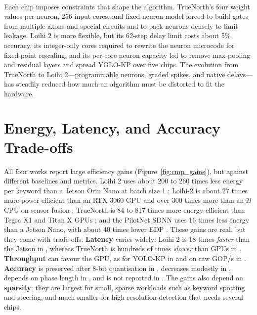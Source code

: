 \documentclass[12pt,a4paper,final]{extreport}
\begin{document}
\paragraph{} Each chip imposes constraints that shape the algorithm. TrueNorth's four weight values per neuron, 256-input cores, and fixed neuron model forced \cite{p3} to build gates from multiple axons and special circuits and to pack neurons densely to limit leakage. Loihi 2 is more flexible, but its 62-step delay limit costs \cite{p1} about 5\% accuracy, its integer-only cores required \cite{p4} to rewrite the neuron microcode for fixed-point rescaling, and its per-core neuron capacity led \cite{p4} to remove max-pooling and residual layers and spread YOLO-KP over five chips. The evolution from TrueNorth to Loihi 2---programmable neurons, graded spikes, and native delays---has steadily reduced how much an algorithm must be distorted to fit the hardware.

\section{Energy, Latency, and Accuracy Trade-offs}

\paragraph{} All four works report large efficiency gains (Figure~\ref{fig:cmp_gains}), but against different baselines and metrics. Loihi 2 uses about 200 to 260 times less energy per keyword than a Jetson Orin Nano at batch size 1 \cite{p1}; Loihi-2 is about 27 times more power-efficient than an RTX 3060 GPU and over 300 times more than an i9 CPU on sensor fusion \cite{p2}; TrueNorth is 84 to 817 times more energy-efficient than Tegra X1 and Titan X GPUs \cite{p3}; and the PilotNet SDNN uses 16 times less energy than a Jetson Nano, with about 40 times lower EDP \cite{p4}. These gains are real, but they come with trade-offs. \textbf{Latency} varies widely: Loihi 2 is 18 times \emph{faster} than the Jetson in \cite{p1}, whereas TrueNorth is hundreds of times \emph{slower} than GPUs in \cite{p3}. \textbf{Throughput} can favour the GPU, as for YOLO-KP in \cite{p4} and on raw GOP/s in \cite{p2}. \textbf{Accuracy} is preserved after 8-bit quantisation in \cite{p1}, decreases modestly in \cite{p4}, depends on phase length in \cite{p3}, and is not reported in \cite{p2}. The gains also depend on \textbf{sparsity}: they are largest for small, sparse workloads such as keyword spotting and steering, and much smaller for high-resolution detection that needs several chips.
\end{document}
